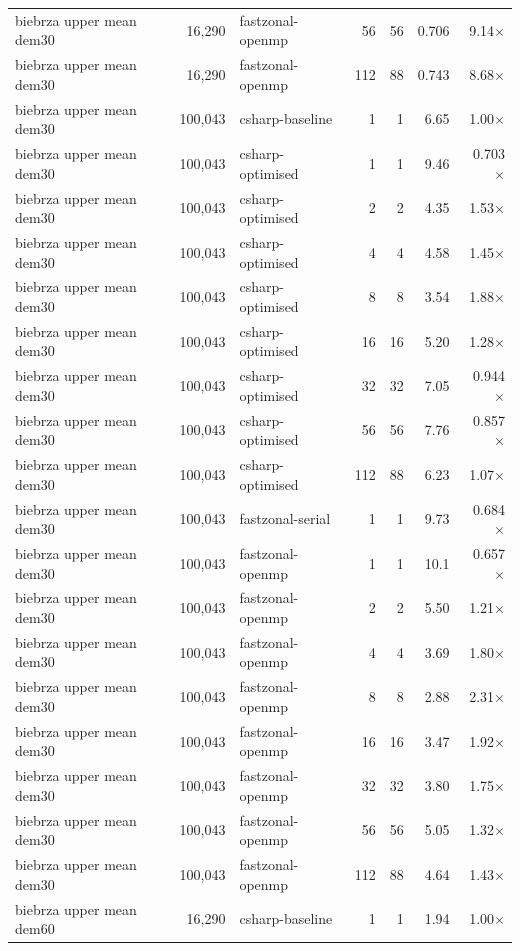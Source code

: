 \begin{tabular}{lrlrrrr}
biebrza upper mean dem30 & 16,290 & fastzonal-openmp & 56 & 56 & 0.706 & 9.14$\times$ \\
biebrza upper mean dem30 & 16,290 & fastzonal-openmp & 112 & 88 & 0.743 & 8.68$\times$ \\
biebrza upper mean dem30 & 100,043 & csharp-baseline & 1 & 1 & 6.65 & 1.00$\times$ \\
biebrza upper mean dem30 & 100,043 & csharp-optimised & 1 & 1 & 9.46 & 0.703$\times$ \\
biebrza upper mean dem30 & 100,043 & csharp-optimised & 2 & 2 & 4.35 & 1.53$\times$ \\
biebrza upper mean dem30 & 100,043 & csharp-optimised & 4 & 4 & 4.58 & 1.45$\times$ \\
biebrza upper mean dem30 & 100,043 & csharp-optimised & 8 & 8 & 3.54 & 1.88$\times$ \\
biebrza upper mean dem30 & 100,043 & csharp-optimised & 16 & 16 & 5.20 & 1.28$\times$ \\
biebrza upper mean dem30 & 100,043 & csharp-optimised & 32 & 32 & 7.05 & 0.944$\times$ \\
biebrza upper mean dem30 & 100,043 & csharp-optimised & 56 & 56 & 7.76 & 0.857$\times$ \\
biebrza upper mean dem30 & 100,043 & csharp-optimised & 112 & 88 & 6.23 & 1.07$\times$ \\
biebrza upper mean dem30 & 100,043 & fastzonal-serial & 1 & 1 & 9.73 & 0.684$\times$ \\
biebrza upper mean dem30 & 100,043 & fastzonal-openmp & 1 & 1 & 10.1 & 0.657$\times$ \\
biebrza upper mean dem30 & 100,043 & fastzonal-openmp & 2 & 2 & 5.50 & 1.21$\times$ \\
biebrza upper mean dem30 & 100,043 & fastzonal-openmp & 4 & 4 & 3.69 & 1.80$\times$ \\
biebrza upper mean dem30 & 100,043 & fastzonal-openmp & 8 & 8 & 2.88 & 2.31$\times$ \\
biebrza upper mean dem30 & 100,043 & fastzonal-openmp & 16 & 16 & 3.47 & 1.92$\times$ \\
biebrza upper mean dem30 & 100,043 & fastzonal-openmp & 32 & 32 & 3.80 & 1.75$\times$ \\
biebrza upper mean dem30 & 100,043 & fastzonal-openmp & 56 & 56 & 5.05 & 1.32$\times$ \\
biebrza upper mean dem30 & 100,043 & fastzonal-openmp & 112 & 88 & 4.64 & 1.43$\times$ \\
biebrza upper mean dem60 & 16,290 & csharp-baseline & 1 & 1 & 1.94 & 1.00$\times$ \\

\end{tabular}
